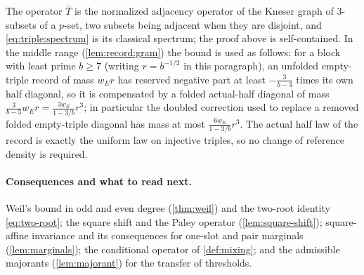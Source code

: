 The operator $\bar T$ is the normalized adjacency operator of the Kneser graph
of $3$-subsets of a $p$-set, two subsets being adjacent when they are disjoint,
and \eqref{eq:triple:spectrum} is its classical spectrum; the proof above is
self-contained. In the middle range (\cref{lem:record:gram}) the bound is used as follows: for a block with least prime $b\ge7$
(writing $r=b^{-1/2}$ in this paragraph), an unfolded
empty-triple record of mass $w_Er$ has reserved
negative part at least $-\frac3{b-3}$ times its own half diagonal, so it is
compensated by a folded actual-half diagonal of mass
$\frac3{b-3}w_Er=\frac{3w_E}{1-3/b}r^3$; in particular the doubled correction
used to replace a removed folded empty-triple diagonal has mass at most
$\frac{6w_E}{1-3/b}r^3$. The actual half law of the record is exactly the
uniform law on injective triples, so no change of reference density is
required.

\paragraph{Consequences and what to read next.}
Weil's bound in odd and even degree (\cref{thm:weil}) and the two-root identity
\eqref{eq:two-root}; the square shift and the Paley operator
(\cref{lem:square-shift}); square-affine invariance and its consequences for one-slot
and pair marginals (\cref{lem:marginals}); the conditional operator of
\cref{def:mixing}; and the admissible majorants (\cref{lem:majorant}) for the
transfer of thresholds.
